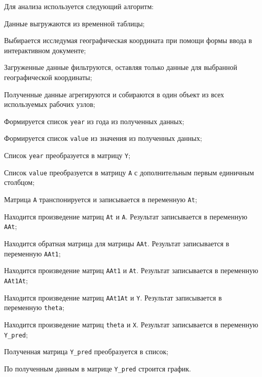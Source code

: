 Для анализа используется следующий алгоритм:
\begin{enumerate_step}
    \item Данные выгружаются из временной таблицы;
    \item Выбирается исследумая географическая координата при помощи формы ввода в интерактивном документе;
    \item Загруженные данные фильтруются, оставляя только данные для выбранной географической координаты;
    \item Полученные данные агрегируются и собираются в один объект из всех используемых рабочих узлов;
    \item Формируется список \texttt{year} из года из полученных данных;
    \item Формируется список \texttt{value} из значения из полученных данных;
    \item Список \texttt{year} преобразуется в матрицу \texttt{Y};
    \item Список \texttt{value} преобразуется в матрицу \texttt{A} с дополнительным первым единичным столбцом;
    \item Матрица \texttt{A} транспонируется и записывается в переменную \texttt{At};
    \item Находится произведение матриц \texttt{At} и \texttt{A}. Результат записывается в переменную \texttt{AAt};
    \item Находится обратная матрица для матрицы \texttt{AAt}. Результат записывается в переменную \texttt{AAt1};
    \item Находится произведение матриц \texttt{AAt1} и \texttt{At}. Результат записывается в переменную \texttt{AAt1At};
    \item Находится произведение матриц \texttt{AAt1At} и \texttt{Y}. Результат записывается в переменную \texttt{theta};
    \item Находится произведение матриц \texttt{theta} и \texttt{X}. Результат записывается в переменную \texttt{Y_pred};
    \item Полученная матрица \texttt{Y_pred} преобразуется в список;
    \item По полученным данным в матрице \texttt{Y_pred} строится график.
\end{enumerate_step}
